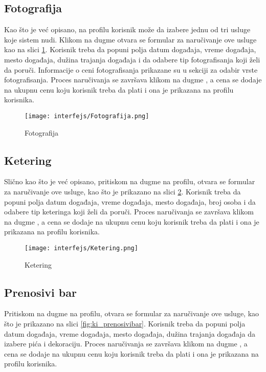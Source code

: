 \documentclass[a4paper]{article}
\begin{document}
\subsection{Fotografija}

Kao što je već opisano, na profilu korisnik može da izabere jednu od tri usluge koje sistem nudi. Klikom na dugme  otvara se formular za naručivanje ove usluge kao na slici \ref{fig:ki_fotografija}. Korisnik treba da popuni polja datum događaja, vreme događaja, mesto događaja, dužina trajanja događaja i da odabere tip fotografisanja koji želi da poruči. Informacije o ceni fotografisanja prikazane su u sekciji za odabir vrste fotografisanja. Proces naručivanja se završava klikom na dugme , a cena se dodaje na ukupnu cenu koju korisnik treba da plati i ona je prikazana na profilu korisnika. 

\begin{figure}[H]
    \centering
    \texttt{[image: interfejs/Fotografija.png]}
    \caption{Fotografija}
    \label{fig:ki_fotografija}
\end{figure}

\subsection{Ketering}

Slično kao što je već opisano, pritiskom na dugme  na profilu, otvara se formular za naručivanje ove usluge, kao što je prikazano na slici \ref{fig:ki_ketering}. Korisnik treba da popuni polja datum događaja, vreme događaja, mesto događaja, broj osoba i da odabere tip keteringa koji želi da poruči. Proces naručivanja se završava klikom na dugme , a cena se dodaje na ukupnu cenu koju korisnik treba da plati i ona je prikazana na profilu korisnika.  

\begin{figure}[H]
    \centering
    \texttt{[image: interfejs/Ketering.png]}
    \caption{Ketering}
    \label{fig:ki_ketering}
\end{figure}

\subsection{Prenosivi bar}

Pritiskom na dugme  na profilu, otvara se formular za naručivanje ove usluge, kao što je prikazano na slici \ref{fig:ki_prenosivibar}. Korisnik treba da popuni polja datum događaja, vreme događaja, mesto događaja, dužina trajanja događaja da izabere pića i dekoraciju. Proces naručivanja se završava klikom na dugme , a cena se dodaje na ukupnu cenu koju korisnik treba da plati i ona je prikazana na profilu korisnika.  
\end{document}
